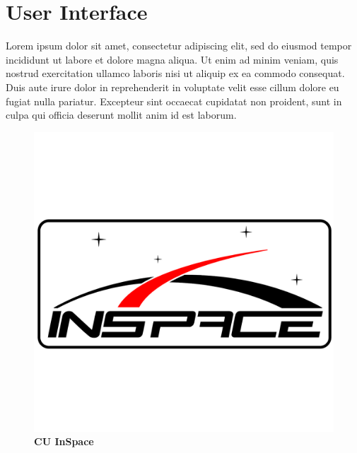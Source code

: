 \sectionfont{\fontsize{14}{14}\selectfont}
\section{User Interface}

Lorem ipsum dolor sit amet, consectetur adipiscing elit, sed do eiusmod tempor incididunt ut labore et dolore magna aliqua. Ut enim ad minim veniam, quis nostrud exercitation ullamco laboris nisi ut aliquip ex ea commodo consequat. Duis aute irure dolor in reprehenderit in voluptate velit esse cillum dolore eu fugiat nulla pariatur. Excepteur sint occaecat cupidatat non proident, sunt in culpa qui officia deserunt mollit anim id est laborum.

\begin{figure}[ht]
\centering
\includegraphics[width=12cm]{images/cuinspace_logo.png}
\caption{\bf CU InSpace \cite{GPS}}
\label{fig:cu inspace}
\end{figure}